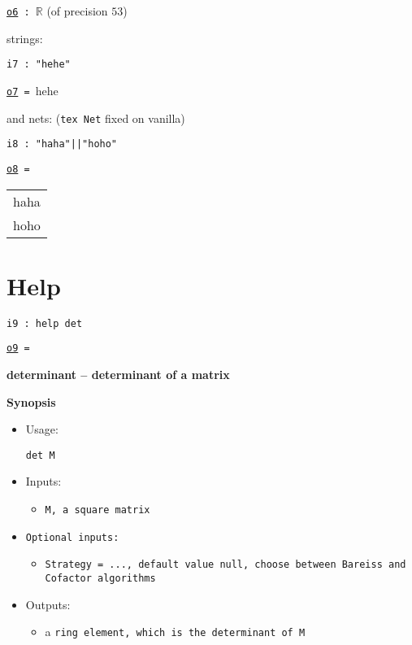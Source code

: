 \documentclass[12pt,a4paper]{amsart}
\begin{document}
\noindent\underline{\tt o6}\verb| : |${\mathbb R}$ (of precision $53$)
\smallskip

strings:
\smallskip
\begin{verbatim}
i7 : "hehe"
\end{verbatim}
\noindent\underline{\tt o7}\verb| = |hehe
\smallskip

and nets: ({\tt tex Net} fixed on vanilla)
\smallskip
\begin{verbatim}
i8 : "haha"||"hoho"
\end{verbatim}
\noindent\underline{\tt o8}\verb| = |\begin{tabular}[t]{l}haha\\
hoho\end{tabular}
\smallskip


\section{Help}
\smallskip
\begin{verbatim}
i9 : help det
\end{verbatim}
\noindent\underline{\tt o9}\verb| = |
\par \medskip\noindent\begingroup\Large\bf
determinant -- determinant of a matrix\endgroup
\par \smallskip%

\par \medskip\noindent\begingroup\Large\bf
Synopsis\endgroup
\par \smallskip%
\begin{itemize}
\item 
\par Usage: 
\par \begingroup\tt det\ M\endgroup{}
\item Inputs:\begin{itemize}
\item \begingroup\tt M\endgroup{}, a square \begingroup\tt matrix\endgroup{}
\end{itemize}

\item \begingroup\tt Optional\ inputs\endgroup{}:\begin{itemize}
\item \begingroup\tt Strategy\endgroup{}\begingroup\tt \ ={}\ \endgroup{}\begingroup\tt ...\endgroup{}, default value null, choose between Bareiss and Cofactor algorithms
\end{itemize}

\item Outputs:\begin{itemize}
\item a \begingroup\tt ring\ element\endgroup{}, which is the determinant of \begingroup\tt M\endgroup{}
\end{itemize}

\end{itemize}
\end{document}
